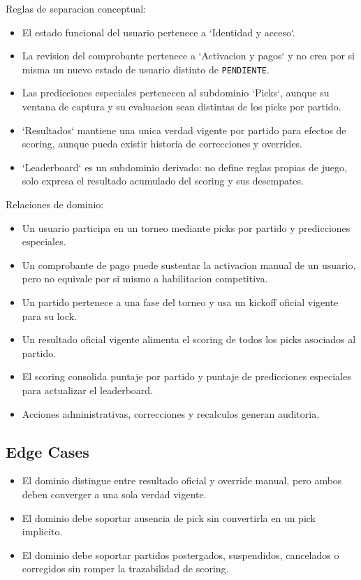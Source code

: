 Reglas de separacion conceptual:

\begin{itemize}
  \item El estado funcional del usuario pertenece a `Identidad y acceso`.
  \item La revision del comprobante pertenece a `Activacion y pagos` y no crea por si misma un nuevo estado de usuario distinto de \texttt{PENDIENTE}.
  \item Las predicciones especiales pertenecen al subdominio `Picks`, aunque su ventana de captura y su evaluacion sean distintas de los picks por partido.
  \item `Resultados` mantiene una unica verdad vigente por partido para efectos de scoring, aunque pueda existir historia de correcciones y overrides.
  \item `Leaderboard` es un subdominio derivado: no define reglas propias de juego, solo expresa el resultado acumulado del scoring y sus desempates.
\end{itemize}

Relaciones de dominio:

\begin{itemize}
  \item Un usuario participa en un torneo mediante picks por partido y predicciones especiales.
  \item Un comprobante de pago puede sustentar la activacion manual de un usuario, pero no equivale por si mismo a habilitacion competitiva.
  \item Un partido pertenece a una fase del torneo y usa un kickoff oficial vigente para su lock.
  \item Un resultado oficial vigente alimenta el scoring de todos los picks asociados al partido.
  \item El scoring consolida puntaje por partido y puntaje de predicciones especiales para actualizar el leaderboard.
  \item Acciones administrativas, correcciones y recalculos generan auditoria.
\end{itemize}

\subsection{Edge Cases}

\begin{itemize}
  \item El dominio distingue entre resultado oficial y override manual, pero ambos deben converger a una sola verdad vigente.
  \item El dominio debe soportar ausencia de pick sin convertirla en un pick implicito.
  \item El dominio debe soportar partidos postergados, suspendidos, cancelados o corregidos sin romper la trazabilidad de scoring.
\end{itemize}

